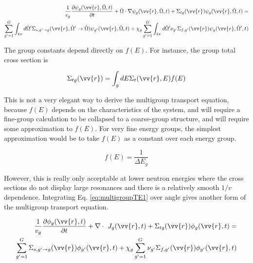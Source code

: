\documentclass[10pt]{article}
\begin{document}
\begin{flushleft}
\begin{equation}
\label{eq:multigroupTE1}
\begin{aligned}
\frac{1}{v_g}\frac{\partial \psi_g(\vv{r}, \hat{\Omega}, t)}{\partial t} + \hat{\Omega}\cdot\nabla\psi_g(\vv{r}, \hat{\Omega}, t) + \Sigma_{tg}(\vv{r})\psi_g(\vv{r}, \hat{\Omega}, t) =\\
\sum_{g'=1}^{G} \int_{4\pi}^{} d\hat{\Omega}' \Sigma_{s, g'\rightarrow g}(\vv{r}, \hat{\Omega}' \rightarrow\hat{\Omega})\psi_{g'}(\vv{r}, \hat{\Omega}, t) + \chi_g \sum_{g'=1}^{G}\int_{4\pi}^{} d\hat{\Omega}' \nu_{g'}\Sigma_{f,g'}(\vv{r})\psi_g(\vv{r}, \hat{\Omega}', t)
\end{aligned}
\end{equation}

The group constants depend directly on \(f(E)\). For instance, the group total cross section is

\begin{equation}
\label{eq:multigroupTE1_constants1}
\Sigma_{tg}(\vv{r}) = \int_{g} dE \Sigma_t(\vv{r}, E) f(E)
\end{equation}

This is not a very elegant way to derive the multigroup transport equation, because \(f(E)\) depends on the characteristics of the system, and will require a fine-group calculation to be collapsed to a coarse-group structure, and will require some approximation to \(f(E)\). For very fine energy groups, the simplest approximation would be to take \(f(E)\) as a constant over each energy group.

\begin{equation}
\label{eq:FineGroupf_E}
f(E) = \frac{1}{\Delta E_g}
\end{equation}

However, this is really only acceptable at lower neutron energies where the cross sections do not display large resonances and there is a relatively smooth \(1/v\) dependence. Integrating Eq. \ref{eq:multigroupTE1} over angle gives another form of the multigroup transport equation.

\begin{equation}
\label{eq:multigroupTE2}
\begin{aligned}
\frac{1}{v_g} \frac{\partial\phi_g(\vv{r}, t)}{\partial t} + \nabla\cdot\ J_g(\vv{r}, t) + \Sigma_{tg}(\vv{r})\phi_g(\vv{r}, t) =\\
\sum_{g'=1}^{G} \Sigma_{s, g'\rightarrow g}(\vv{r})\phi_{g'}(\vv{r}, t) + \chi_g \sum_{g'=1}^{G} \nu_{g'}\Sigma_{f,g'}(\vv{r})\phi_{g'}(\vv{r}, t)
\end{aligned}
\end{equation}






\end{flushleft}
\end{document}
